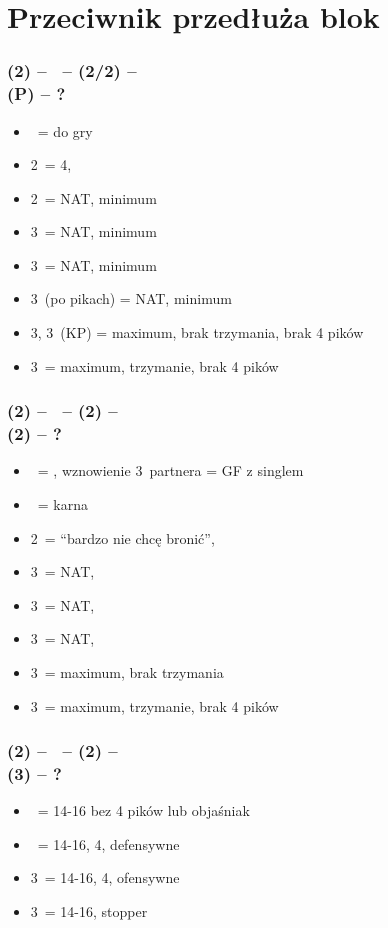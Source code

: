 \documentclass[12pt, a4paper]{article}
\begin{document}
\section{Przeciwnik przedłuża blok}

\subsubsection*{(2\diams) -- \dbl\ -- (2\hearts/2\spades) -- \dbl \\ (P) -- ?}
\begin{itemize}
    \item \pass\ = do gry
    \item 2\spades\ = 4\spades, \fonce
    \item 2\nt\ = NAT, minimum
    \item 3\clubs\ = NAT, minimum
    \item 3\diams\ = NAT, minimum
    \item 3\hearts\ (po pikach) = NAT, minimum
    \item 3\hearts, 3\spades\ (KP) = maximum, brak trzymania, brak 4 pików
    \item 3\nt\ = maximum, trzymanie, brak 4 pików
\end{itemize}

\subsubsection*{(2\diams) -- \dbl\ -- (2\hearts) -- \dbl \\ (2\spades) -- ?}
\begin{itemize}
    \item \pass\ = \fonce, wznowienie 3\spades\ partnera = GF z singlem \spades
    \item \dbl\ = karna
    \item 2\nt\ = ``bardzo nie chcę bronić'', \gf
    \item 3\clubs\ = NAT, \gf
    \item 3\diams\ = NAT, \gf
    \item 3\hearts\ = NAT, \gf
    \item 3\spades\ = maximum, brak trzymania
    \item 3\nt\ = maximum, trzymanie, brak 4 pików
\end{itemize}

\subsubsection*{(2\diams) -- \dbl\ -- (2\spades) -- \dbl \\ (3\hearts) -- ?}
\begin{itemize}
    \item \pass\ = 14-16 bez 4 pików lub objaśniak \fonce
    \item \dbl\ = 14-16, 4\spades, defensywne
    \item 3\spades\ = 14-16, 4\spades, ofensywne
    \item 3\nt\ = 14-16, stopper
\end{itemize}
\end{document}
